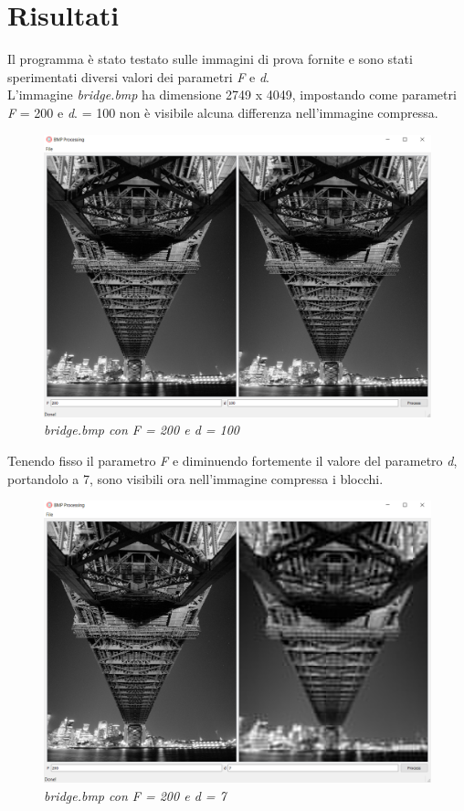 \documentclass[a4paper,12pt]{report}
\begin{document}
\section{Risultati}
Il programma è stato testato sulle immagini di prova fornite e sono stati sperimentati diversi valori dei parametri \textit{F} e \textit{d}. \\

\noindent L'immagine \textit{bridge.bmp} ha dimensione 2749 x 4049, impostando come parametri  \textit{F} = 200 e \textit{d}. = 100 non è visibile alcuna differenza nell'immagine compressa.

\begin{figure}[H]
\centering
\includegraphics[width=0.8\linewidth]{../img/bridge_200_100.png}
\caption{\textit{bridge.bmp con F = 200 e d = 100}}
\end{figure}

\noindent Tenendo fisso il parametro \textit{F} e diminuendo fortemente il valore del parametro \textit{d}, portandolo a 7, sono visibili ora nell'immagine compressa i blocchi.

\begin{figure}[H]
\centering
\includegraphics[width=0.8\linewidth]{../img/bridge_200_7.png}
\caption{\textit{bridge.bmp con F = 200 e d = 7}}
\end{figure}
\end{document}
